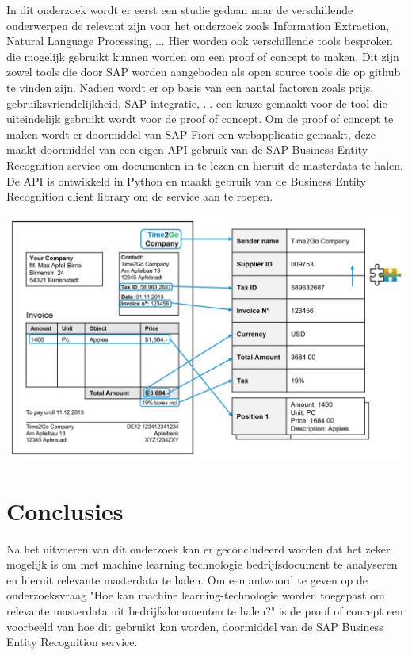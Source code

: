 \documentclass[a0,portrait]{hogent-poster}
\begin{document}
\begin{multicols}{2}
In dit onderzoek wordt er eerst een studie gedaan naar de verschillende onderwerpen de relevant zijn voor het onderzoek zoals Information Extraction, Natural Language Processing, ... Hier worden ook verschillende tools besproken die mogelijk gebruikt kunnen worden om een proof of concept te maken. Dit zijn zowel tools die door SAP worden aangeboden als open source tools die op github te vinden zijn. 
Nadien wordt er op basis van een aantal factoren zoals prijs, gebruiksvriendelijkheid, SAP integratie, ... een keuze gemaakt voor de tool die uiteindelijk gebruikt wordt voor de proof of concept. Om de proof of concept te maken wordt er doormiddel van SAP Fiori een webapplicatie gemaakt, deze maakt doormiddel van een eigen API gebruik van de SAP Business Entity Recognition service om documenten in te lezen en hieruit de masterdata te halen. De API is ontwikkeld in Python en maakt gebruik van de Business Entity Recognition client library om de service aan te roepen.
\begin{center}
  \captionsetup{type=figure}
  \includegraphics[width=1.0\linewidth]{./graphics/information_extraction.png}
\end{center}

\section{Conclusies}

Na het uitvoeren van dit onderzoek kan er geconcludeerd worden dat het zeker mogelijk is om met machine learning technologie bedrijfsdocument te analyseren en hieruit relevante masterdata te halen. Om een antwoord te geven op de onderzoeksvraag "Hoe kan machine learning-technologie worden toegepast om relevante masterdata uit bedrijfsdocumenten te halen?" is de proof of concept een voorbeeld van hoe dit gebruikt kan worden, doormiddel van de SAP Business Entity Recognition service.


\end{multicols}
\end{document}

